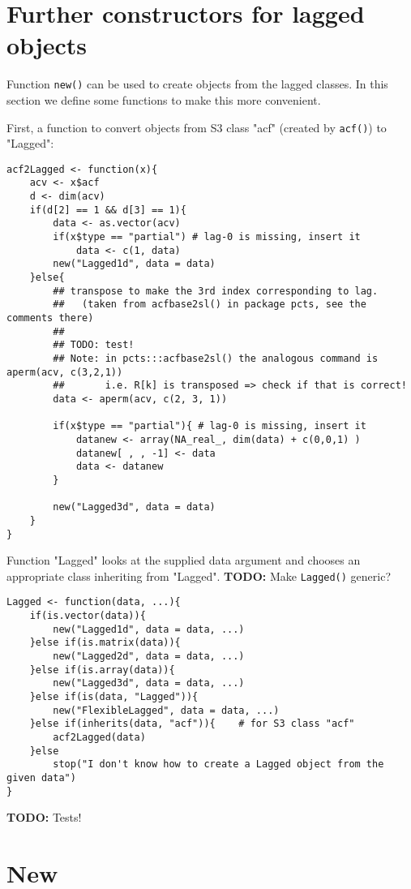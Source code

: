 \documentclass[11pt,a4paper]{article}
\begin{document}
\section{Further constructors for lagged objects}
\label{sec:org0ce69ec}

Function \texttt{new()} can be used to create objects from the lagged classes.
In this section we define some functions to make this more convenient.

First, a function to convert objects from S3 class "acf" (created by \texttt{acf()}) to "Lagged":
\begin{verbatim}
acf2Lagged <- function(x){
    acv <- x$acf
    d <- dim(acv)
    if(d[2] == 1 && d[3] == 1){
        data <- as.vector(acv)
        if(x$type == "partial") # lag-0 is missing, insert it
            data <- c(1, data)
        new("Lagged1d", data = data)
    }else{
        ## transpose to make the 3rd index corresponding to lag.
        ##   (taken from acfbase2sl() in package pcts, see the comments there)
        ##
        ## TODO: test!
        ## Note: in pcts:::acfbase2sl() the analogous command is aperm(acv, c(3,2,1))
        ##       i.e. R[k] is transposed => check if that is correct!
        data <- aperm(acv, c(2, 3, 1))

        if(x$type == "partial"){ # lag-0 is missing, insert it
            datanew <- array(NA_real_, dim(data) + c(0,0,1) )
            datanew[ , , -1] <- data
            data <- datanew
        }

        new("Lagged3d", data = data)
    }
}
\end{verbatim}


Function "Lagged" looks at the supplied data argument and chooses an appropriate class
inheriting from "Lagged". \textbf{TODO:} Make \texttt{Lagged()} generic?
\begin{verbatim}
Lagged <- function(data, ...){
    if(is.vector(data)){
        new("Lagged1d", data = data, ...)
    }else if(is.matrix(data)){
        new("Lagged2d", data = data, ...)
    }else if(is.array(data)){
        new("Lagged3d", data = data, ...)
    }else if(is(data, "Lagged")){
        new("FlexibleLagged", data = data, ...)
    }else if(inherits(data, "acf")){    # for S3 class "acf"
        acf2Lagged(data)
    }else
        stop("I don't know how to create a Lagged object from the given data")
}
\end{verbatim}

\textbf{TODO:} Tests!


\section{New}
\label{sec:org8e6c5d3}
\end{document}
